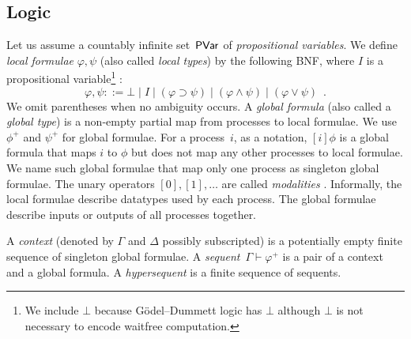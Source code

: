 \subsection{Logic}

\newcommand{\m}[1]{{#1}^+}

Let us assume a countably infinite set~$\mathsf{PVar}$ of \textit{propositional
variables}.  We define \textit{local
formulae}
$\varphi, \psi$ (also called \textit{local types}) by the following BNF, where $I$ is a propositional
variable\footnote{We include $\bot$ because G\"odel--Dummett logic has
$\bot$ although $\bot$ is not necessary to encode waitfree computation.}%
:
\[
 \varphi,\psi ::= \bot \mid I \mid (\varphi\supset\psi) \mid (\varphi\wedge\psi) \mid
 (\varphi\vee\psi)\enspace.
\]
We omit parentheses when no ambiguity occurs.
A \textit{global formula}
(also called a \textit{global type})
is a non-empty partial map from processes to local
formulae.
We use $\m\phi$ and $\m\psi$ for global formulae.  For a process~$i$,
as a notation, $[i]\phi$ is a global formula that maps $i$ to $\phi$ but
does not map any other processes to local formulae.
We name such global formulae that map only one process as singleton
global formulae.
The unary operators $[0], [1],\ldots$ are called \textit{modalities}%
.
Informally, the local formulae describe datatypes used by each process.
The global formulae describe inputs or outputs of all
processes together.

A \textit{context} (denoted by $\Gamma$ and $\Delta$ possibly
subscripted) is a potentially empty
finite sequence of singleton global formulae.
A \textit{sequent}~$\Gamma\vdash\m\varphi$ is a pair of a
context and a
global formula.
A \textit{hypersequent} is a finite sequence of sequents.

